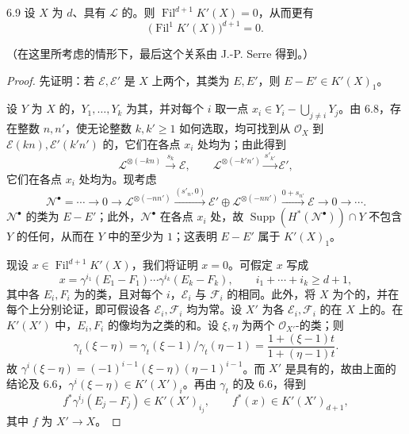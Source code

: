 \begin{SGAresult}{}{6.9}
设 $X$ 为 $d$、具有 $\mathcal L$ 的。则 $\operatorname{Fil}^{d+1}K'(X)=0$，从而更有
\[
\bigl(\operatorname{Fil}^1K'(X)\bigr)^{d+1}=0.
\]
\end{SGAresult}
（在这里所考虑的情形下，最后这个关系由 J.-P. Serre 得到。）
\begin{proof}
先证明：若 $\mathcal E,\mathcal E'$ 是 $X$ 上两个，其类为 $E,E'$，则 $E-E'\in K'(X)_1$。

设 $Y$ 为 $X$ 的，$Y_1,\ldots,Y_k$ 为其，并对每个 $i$ 取一点 $x_i\in Y_i-\bigcup_{j\ne i}Y_j$。由 6.8，存在整数 $n,n'$，使无论整数 $k,k'\geq1$ 如何选取，均可找到从 $\mathcal O_X$ 到 $\mathcal E(kn),\mathcal E'(k'n')$ 的，它们在各点 $x_i$ 处均为；由此得到
\[
\mathcal L^{\otimes(-kn)}\xrightarrow{s_k}\mathcal E,\qquad
\mathcal L^{\otimes(-k'n')}\xrightarrow{s'_{k'}}\mathcal E',
\]
它们在各点 $x_i$ 处均为。现考虑
\[
\mathcal N^\bullet=\cdots\longrightarrow0\longrightarrow
\mathcal L^{\otimes(-nn')}\xrightarrow{(s'_n,0)}
\mathcal E'\oplus\mathcal L^{\otimes(-nn')}
\xrightarrow{0+s_{n'}}\mathcal E\longrightarrow0\longrightarrow\cdots.
\]
$\mathcal N^\bullet$ 的类为 $E-E'$；此外，$\mathcal N^\bullet$ 在各点 $x_i$ 处，故 $\operatorname{Supp}(H^*(\mathcal N^\bullet))\cap Y$ 不包含 $Y$ 的任何，从而在 $Y$ 中的至少为 $1$；这表明 $E-E'$ 属于 $K'(X)_1$。

现设 $x\in\operatorname{Fil}^{d+1}K'(X)$，我们将证明 $x=0$。可假定 $x$ 写成
\[
x=\gamma^{i_1}(E_1-F_1)\cdots\gamma^{i_k}(E_k-F_k),\qquad i_1+\cdots+i_k\geq d+1,
\]
其中各 $E_i,F_i$ 为的类，且对每个 $i$，$\mathcal E_i$ 与 $\mathcal F_i$ 的相同。此外，将 $X$ 为个的，并在每个上分别论证，即可假设各 $\mathcal E_i,\mathcal F_i$ 均为常。设 $X'$ 为各 $\mathcal E_i,\mathcal F_i$ 的在 $X$ 上的。在 $K'(X')$ 中，$E_i,F_i$ 的像均为之类的和。设 $\xi,\eta$ 为两个 $\mathcal O_{X'}$-的类；则
\[
\gamma_t(\xi-\eta)=\gamma_t(\xi-1)/\gamma_t(\eta-1)
=\frac{1+(\xi-1)t}{1+(\eta-1)t}.
\]
故 $\gamma^i(\xi-\eta)=(-1)^{i-1}(\xi-\eta)(\eta-1)^{i-1}$。而 $X'$ 是具有的，故由上面的结论及 6.6，$\gamma^i(\xi-\eta)\in K'(X')_i$。再由 $\gamma_t$ 的及 6.6，得到
\[
f^*\gamma^{i_j}(E_j-F_j)\in K'(X')_{i_j},\qquad
f^*(x)\in K'(X')_{d+1},
\]
其中 $f$ 为 $X'\longrightarrow X$。


\end{proof}
